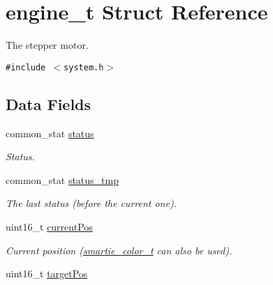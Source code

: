 \hypertarget{structengine__t}{
\section{engine\_\-t Struct Reference}
\label{structengine__t}
}
The stepper motor.  


{\tt \#include $<$system.h$>$}

\subsection*{Data Fields}
\begin{CompactItemize}
\item 
\hypertarget{structengine__t_08332b12fc6cb45131cc4d21a54d0d56}{
common\_\-stat \hyperlink{structengine__t_08332b12fc6cb45131cc4d21a54d0d56}{status}}
\label{structengine__t_08332b12fc6cb45131cc4d21a54d0d56}

\begin{CompactList}\small\item\em Status. \item\end{CompactList}\item 
\hypertarget{structengine__t_fd5f4a945af1dba45c888935952af8e6}{
common\_\-stat \hyperlink{structengine__t_fd5f4a945af1dba45c888935952af8e6}{status\_\-tmp}}
\label{structengine__t_fd5f4a945af1dba45c888935952af8e6}

\begin{CompactList}\small\item\em The last status (before the current one). \item\end{CompactList}\item 
\hypertarget{structengine__t_ab3112598c1c666278837e9f329c8436}{
uint16\_\-t \hyperlink{structengine__t_ab3112598c1c666278837e9f329c8436}{currentPos}}
\label{structengine__t_ab3112598c1c666278837e9f329c8436}

\begin{CompactList}\small\item\em Current position (\hyperlink{system_8h_7b19b2744b17f8f369226dd73101a4b2}{smartie\_\-color\_\-t} can also be used). \item\end{CompactList}\item 
\hypertarget{structengine__t_c245c739926cb25dd06da953b527c6f7}{
uint16\_\-t \hyperlink{structengine__t_c245c739926cb25dd06da953b527c6f7}{targetPos}}
\label{structengine__t_c245c739926cb25dd06da953b527c6f7}


\end{CompactItemize}
